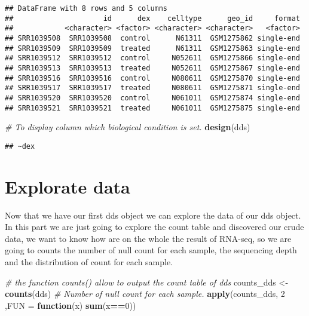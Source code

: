 \documentclass[]{article}
\newenvironment{Shaded}{\begin{snugshade}}{\end{snugshade}}
\newcommand{\KeywordTok}[1]{\textcolor[rgb]{0.13,0.29,0.53}{\textbf{#1}}}
\newcommand{\DataTypeTok}[1]{\textcolor[rgb]{0.13,0.29,0.53}{#1}}
\newcommand{\DecValTok}[1]{\textcolor[rgb]{0.00,0.00,0.81}{#1}}
\newcommand{\StringTok}[1]{\textcolor[rgb]{0.31,0.60,0.02}{#1}}
\newcommand{\CommentTok}[1]{\textcolor[rgb]{0.56,0.35,0.01}{\textit{#1}}}
\newcommand{\ControlFlowTok}[1]{\textcolor[rgb]{0.13,0.29,0.53}{\textbf{#1}}}
\newcommand{\OperatorTok}[1]{\textcolor[rgb]{0.81,0.36,0.00}{\textbf{#1}}}
\newcommand{\NormalTok}[1]{#1}
\begin{document}
\begin{verbatim}
## DataFrame with 8 rows and 5 columns
##                     id      dex    celltype      geo_id     format
##            <character> <factor> <character> <character>   <factor>
## SRR1039508  SRR1039508  control      N61311  GSM1275862 single-end
## SRR1039509  SRR1039509  treated      N61311  GSM1275863 single-end
## SRR1039512  SRR1039512  control     N052611  GSM1275866 single-end
## SRR1039513  SRR1039513  treated     N052611  GSM1275867 single-end
## SRR1039516  SRR1039516  control     N080611  GSM1275870 single-end
## SRR1039517  SRR1039517  treated     N080611  GSM1275871 single-end
## SRR1039520  SRR1039520  control     N061011  GSM1275874 single-end
## SRR1039521  SRR1039521  treated     N061011  GSM1275875 single-end
\end{verbatim}

\begin{Shaded}
\begin{Highlighting}[]
\CommentTok{# To display column which biological condition is set.}
\KeywordTok{design}\NormalTok{(dds)}
\end{Highlighting}
\end{Shaded}

\begin{verbatim}
## ~dex
\end{verbatim}

\section{Explorate data}\label{explorate-data}

Now that we have our first dds object we can explore the data of our dds
object. In this part we are just going to explore the count table and
discovered our crude data, we want to know how are on the whole the
result of RNA-seq, so we are going to counts the number of null count
for each sample, the sequencing depth and the distribution of count for
each sample.

\begin{Shaded}
\begin{Highlighting}[]
\CommentTok{# the function counts() allow to output the count table of dds }
\NormalTok{counts_dds <-}\StringTok{ }\KeywordTok{counts}\NormalTok{(dds)}
\CommentTok{# Number of null count for each sample.}
\KeywordTok{apply}\NormalTok{(counts_dds, }\DecValTok{2}\NormalTok{ ,}\DataTypeTok{FUN =} \ControlFlowTok{function}\NormalTok{(x) }\KeywordTok{sum}\NormalTok{(x}\OperatorTok{==}\DecValTok{0}\NormalTok{))}
\end{Highlighting}
\end{Shaded}
\end{document}
